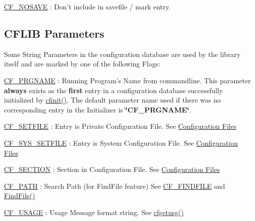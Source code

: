 \begin{DoxyItemize}
\item \hyperlink{group__special__options__mask_gad76153c65f68cc0ee5c1a04c8c3e80bf}{C\-F\-\_\-\-N\-O\-S\-A\-V\-E} \-: Don't include in savefile / mark entry. 
\end{DoxyItemize}\hypertarget{parameter_types_cflib_parameters}{}\subsection{C\-F\-L\-I\-B Parameters}\label{parameter_types_cflib_parameters}
Some String Parameters in the configuration database are used by the library itself and are marked by one of the following Flags\-:


\begin{DoxyItemize}
\item \hyperlink{group__special__options__mask_ga071c29b5177f2df2400712ce8daae9b0}{C\-F\-\_\-\-P\-R\-G\-N\-A\-M\-E} \-: Running Program's Name from commandline.  This parameter {\bfseries always} exists as the {\bfseries first} entry in a configuration database successfully initialized by \hyperlink{group__cflib__core_ga64fb341565c2ddfccd6669e5e6265a8a}{cfinit()}. The default parameter name used if there was no corresponding entry in the Initializer is {\bfseries \char`\"{}\-C\-F\-\_\-\-P\-R\-G\-N\-A\-M\-E\char`\"{}}.
\begin{DoxyItemize}
\item \hyperlink{group__special__options__mask_gafeeb63d4d8c498bec4a237ad8b94f02f}{C\-F\-\_\-\-S\-E\-T\-F\-I\-L\-E} \-: Entry is Private Configuration File.  See \hyperlink{config_files}{Configuration Files}
\item \hyperlink{group__special__options__mask_gabb03ea68e07e388da2c1337a1582c72e}{C\-F\-\_\-\-S\-Y\-S\-\_\-\-S\-E\-T\-F\-I\-L\-E} \-: Entry is System Configuration File.  See \hyperlink{config_files}{Configuration Files}
\item \hyperlink{group__special__options__mask_ga603f0467f101b71f5f869381429ffef4}{C\-F\-\_\-\-S\-E\-C\-T\-I\-O\-N} \-: Section in Configuration File.  See \hyperlink{config_files}{Configuration Files}
\item \hyperlink{group__special__options__mask_gab383c1436888ea6b410141f7c0b1f306}{C\-F\-\_\-\-P\-A\-T\-H} \-: Search Path (for Find\-File feature)  See \hyperlink{group__special__options__mask_ga675b6f8440beecc09fec54d17e9c3ee9}{C\-F\-\_\-\-F\-I\-N\-D\-F\-I\-L\-E} and \hyperlink{group__utilities_ga59fc2b29cf26051e0854b664f5aed15d}{Find\-File()}
\item \hyperlink{group__special__options__mask_gac30981201d7455071cef38a0133b9228}{C\-F\-\_\-\-U\-S\-A\-G\-E} \-: Usage Message format string.  See \hyperlink{group__retrieval_gad3e4e24668cdc111471332a7e79fc897}{cfgetusg()}
\end{DoxyItemize}
\end{DoxyItemize}

